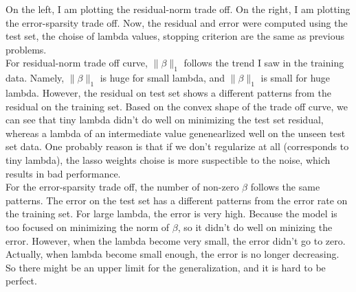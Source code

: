 \documentclass[paper=a4, fontsize=11pt]{scrartcl} %
\numberwithin{equation}{section} %
\numberwithin{figure}{section} %
\numberwithin{table}{section} %
\begin{document}
On the left, I am plotting the residual-norm trade off. On the right, I am plotting the error-sparsity trade off. Now, the residual and error were computed using the test set, the choise of lambda values, stopping criterion are the same as previous problems. \\

For residual-norm trade off curve, $\|\beta\|_1$ follows the trend I saw in the training data. Namely, $\|\beta\|_1$ is huge for small lambda, and $\|\beta\|_1$ is small for huge lambda. However, the residual on test set shows a different patterns from the residual on the training set. Based on the convex shape of the trade off curve, we can see that tiny  lambda didn't do well on minimizing the test set residual, whereas a lambda of an intermediate value genenearlized well on the unseen test set data. One probably reason is that if we don't regularize at all (corresponds to tiny lambda), the lasso weights choise is more suspectible to the noise, which results in bad performance. \\

For the error-sparsity trade off, the number of non-zero $\beta$ follows the same patterns. The error on the test set has a different patterns from the error rate on the training set. For large lambda, the error is very high. Because the model is too focused on minimizing the norm of $\beta$, so it didn't do well on minizing the error. However, when the lambda become very small, the error didn't go to zero. Actually, when lambda become small enough, the error is no longer decreasing. So there might be an upper limit for the generalization, and it is hard to be perfect. 
\end{document}
